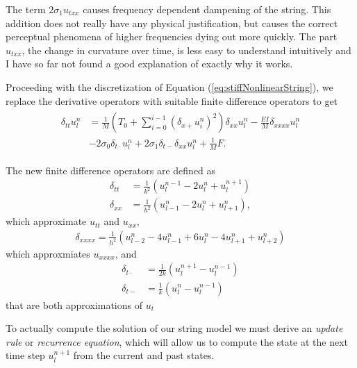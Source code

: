 \documentclass{article}
\begin{document}
The term $2 \sigma_1 u_{txx}$ causes frequency dependent dampening of the string.
This addition does not really have any physical justification, but causes the correct perceptual phenomena of higher frequencies dying out more quickly\cite{bensa_simulation_2003}.
The part $u_{txx}$, the change in curvature over time, is less easy to understand intuitively and I have so far not found a good explanation of exactly why it works.

Proceeding with the discretization of Equation (\ref{eq:stiffNonlinearString}), we replace the derivative operators with suitable finite difference operators to get
\begin{align}
  \begin{split}
    \delta_{tt} u^n_l &= \frac{1}{M} \left(T_0 + \sum^{i-1}_{i=0} (\delta_{x+} u^n_i)^2 \right)\delta_{xx} u^n_l - \frac{E I}{M} \delta_{xxxx} u^n_l\\
    &- 2 \sigma_0 \delta_{t\cdot} u^n_l + 2 \sigma_1 \delta_{t-} \delta_{xx}u^n_l + \frac{1}{M} F.
  \end{split}
\end{align}

The new finite difference operators are defined as
\begin{align}
  \delta_{tt} &= \frac{1}{k^2}(u^{n-1}_l - 2 u^n_l + u^{n+1}_l) \\
  \delta_{xx} &= \frac{1}{h^2}(u^n_{l-1} - 2 u^n_l + u^n_{l+1}),
\end{align}
which approximate $u_{tt}$ and $u_{xx}$,
\begin{align}
  \delta_{xxxx} = \frac{1}{h^2}(u^n_{l-2} - 4 u^n_{l-1} + 6 u^n_l - 4 u^n_{l+1} + u^n_{l+2})
\end{align}
which approxmiates $u_{xxxx}$, and
\begin{align}
  \delta_{t\cdot} &= \frac{1}{2k} (u^{n+1}_l - u^{n-1}_l) \\
  \delta_{t-} &=\frac{1}{k} (u^{n}_l - u^{n-1}_l)
\end{align}
that are both approximations of $u_t$

To actually compute the solution of our string model we must derive an \textit{update rule} or \textit{recurrence equation}, which will allow us to compute the state at the next time step $u^{n+1}_l$ from the current and past states.
\end{document}
